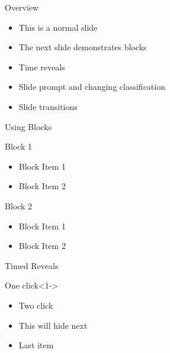 \documentclass{beamer}
\begin{document}
\classification{}

\begin{slide}{Overview}
    \begin{itemize}
        \item This is a normal slide
        \item The next slide demonstrates blocks
        \item Time reveals
        \item Slide prompt and changing classification
        \item Slide transitions
    \end{itemize}
\end{slide}

\begin{slide}{Using Blocks}
    \begin{block}{Block 1}
        \begin{itemize}
            \item Block Item 1
            \item Block Item 2
        \end{itemize}
    \end{block}
    \begin{block}{Block 2}
        \begin{itemize}
            \item Block Item 1
            \item Block Item 2
        \end{itemize}
    \end{block}
\end{slide}


\begin{slide}{Timed Reveals}
    \begin{block}{One click}<1->
        \begin{itemize}
            \item<2->   Two click
            \item<3-4>  This will hide next
            \item<5>    Last item
        \end{itemize}
    \end{block}
\end{slide}


\classification{}
\end{document}
